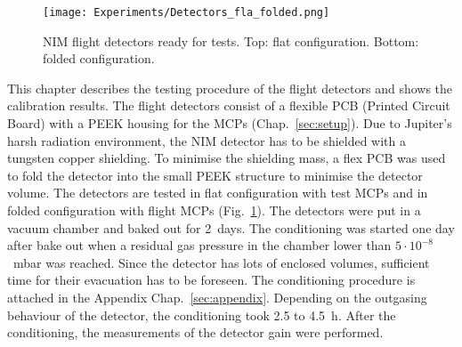 	\begin{figure}[h] %
		\centering
		\texttt{[image: Experiments/Detectors\_fla\_folded.png]}
		\caption{NIM flight detectors ready for tests. Top: flat configuration. Bottom: folded configuration.}
		\label{fig:DetFlatFolded}
	\end{figure}
	This chapter describes the testing procedure of the flight detectors and shows the calibration results. The flight detectors consist of a flexible PCB (Printed Circuit Board) with a PEEK housing for the MCPs (Chap.~\ref{sec:setup}). Due to Jupiter's harsh radiation environment, the NIM detector has to be shielded with a tungsten copper shielding. To minimise the shielding mass, a flex PCB was used to fold the detector into the small PEEK structure to minimise the detector volume. The detectors are tested in flat configuration with test MCPs and in folded configuration with flight MCPs (Fig.~\ref{fig:DetFlatFolded}). The detectors were put in a vacuum chamber and baked out for 2~days. The conditioning was started one day after bake out when a residual gas pressure in the chamber lower than $5\cdot10^{-8}$~mbar was reached. Since the detector has lots of enclosed volumes, sufficient time for their evacuation has to be foreseen. The conditioning procedure is attached in the Appendix Chap.~\ref{sec:appendix}. Depending on the outgasing behaviour of the detector, the conditioning took 2.5 to 4.5~h. After the conditioning, the measurements of the detector gain were performed.\\
